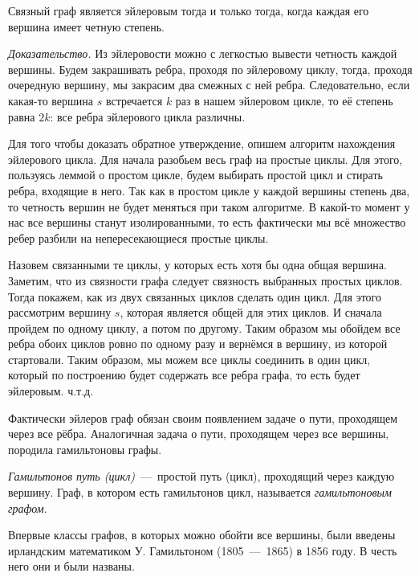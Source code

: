 \begin{theorem}
	Связный граф является эйлеровым тогда и только тогда, когда каждая его вершина имеет четную степень.
	
	\emph{Доказательство.} Из эйлеровости можно с легкостью вывести четность каждой вершины. Будем закрашивать ребра, проходя по эйлеровому циклу, тогда, проходя очередную вершину, мы закрасим два смежных с ней ребра. Следовательно, если какая-то вершина $s$ встречается $k$ раз в нашем эйлеровом цикле, то её степень равна $2k$: все ребра эйлерового цикла различны.
	
	Для того чтобы доказать обратное утверждение, опишем алгоритм нахождения эйлерового цикла. Для начала разобьем весь граф на простые циклы. Для этого, пользуясь леммой о простом цикле, будем выбирать простой цикл и стирать ребра, входящие в него. Так как в простом цикле у каждой вершины степень два, то четность вершин не будет меняться при таком алгоритме. В какой-то момент у нас все вершины станут изолированными, то есть фактически мы всё множество ребер разбили на непересекающиеся простые циклы.
	
	Назовем связанными те циклы, у которых есть хотя бы одна общая вершина. Заметим, что из связности графа следует связность выбранных простых циклов. Тогда покажем, как из двух связанных циклов сделать один цикл. Для этого рассмотрим вершину $s$, которая является общей для этих циклов. И сначала пройдем по одному циклу, а потом по другому. Таким образом мы обойдем все ребра обоих циклов ровно по одному разу и вернёмся в вершину, из которой стартовали. Таким образом, мы можем все циклы соединить в один цикл, который по построению будет содержать все ребра графа, то есть будет эйлеровым. ч.т.д.
\end{theorem}


	Фактически эйлеров граф обязан своим появлением задаче о пути, проходящем через все рёбра. Аналогичная задача о пути, проходящем через все вершины, породила гамильтоновы графы.
	
\begin{definition}
	\emph{Гамильтонов путь (цикл)}~---~простой путь (цикл), проходящий через каждую вершину. Граф, в котором есть гамильтонов цикл, называется \emph{гамильтоновым графом}.
\end{definition}

	Впервые классы графов, в которых можно обойти все вершины, были введены ирландским математиком У. Гамильтоном (1805~---~1865) в 1856 году. В честь него они и были названы.
	
